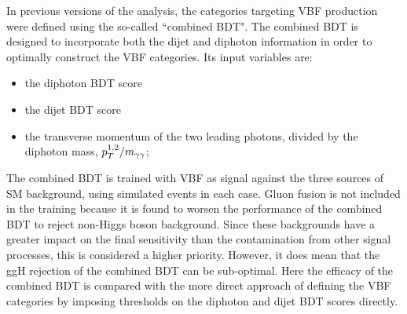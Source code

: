 In previous versions of the analysis, 
the categories targeting VBF production were defined using the so-called ``combined BDT".
The combined BDT is designed to incorporate both the dijet and diphoton information 
in order to optimally construct the VBF categories.
Its input variables are:
\begin{itemize}
\item the diphoton BDT score
\item the dijet BDT score
\item the transverse momentum of the two leading photons, divided by the diphoton mass, $p_T^{1,2}/m_{\gamma\gamma}$;
\end{itemize}
The combined BDT is trained with VBF as signal against the three sources of SM background, 
using simulated events in each case.
Gluon fusion is not included in the training because it is found to worsen the performance 
of the combined BDT to reject non-Higgs boson background.
Since these backgrounds have a greater impact on the final sensitivity 
than the contamination from other signal processes, 
this is considered a higher priority.
However, it does mean that the ggH rejection of the combined BDT can be sub-optimal.
Here the efficacy of the combined BDT is compared with the more direct approach of 
defining the VBF categories by imposing thresholds on the diphoton and dijet BDT scores directly.

